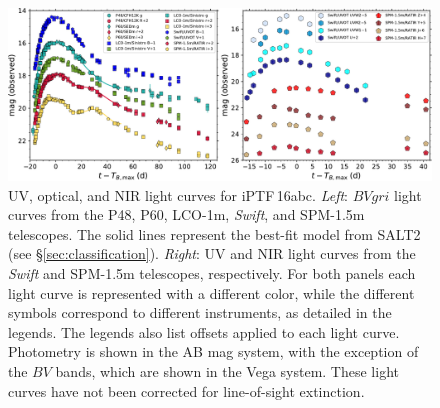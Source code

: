 \documentclass[twocolumn]{aastex61}
\newcommand{\abc}{iPTF\,16abc}
\begin{document}
\begin{figure}[ht]
  \centering
  \includegraphics[width=7in]{lightcurve2.pdf}
  \caption{
  UV, optical, and NIR light curves for \abc. \textit{Left}: $BVgri$ light
  curves from the P48, P60, LCO-1m, \textit{Swift}, and SPM-1.5m telescopes.
  The solid lines represent the best-fit model from SALT2 (see
  \S\ref{sec:classification}). \textit{Right}: UV and NIR light curves from
  the \textit{Swift} and SPM-1.5m telescopes, respectively. For both panels
  each light curve is represented with a different color, while the
  different symbols correspond to different instruments, as detailed in the
  legends. The legends also list offsets applied to each light curve.
  Photometry is shown in the AB mag system, with the exception of the $BV$
  bands, which are shown in the Vega system. These light curves have not
  been corrected for line-of-sight extinction.}
  \label{fig:ugly_LC}
\end{figure}



\end{document}
